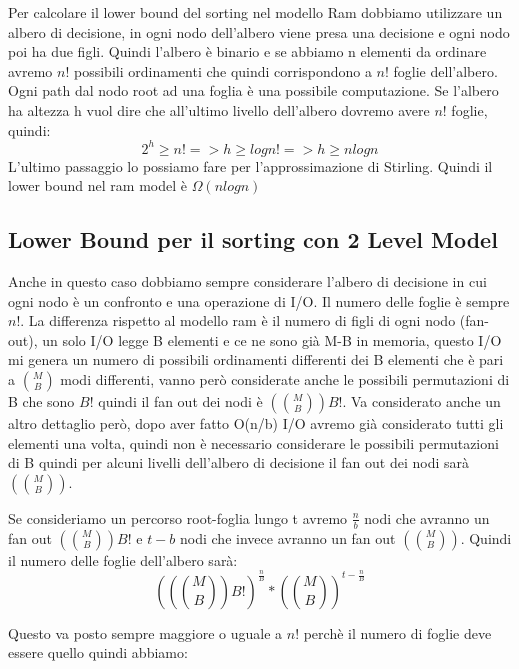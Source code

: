 \documentclass[14pt]{extreport}
\begin{document}
Per calcolare il lower bound del sorting nel modello Ram dobbiamo utilizzare un albero di decisione, in ogni nodo dell'albero viene presa una decisione e ogni nodo poi ha due figli. Quindi l'albero è binario e se abbiamo n elementi da ordinare avremo $n!$ possibili ordinamenti che quindi corrispondono a $n!$ foglie dell'albero.
Ogni path dal nodo root ad una foglia è una possibile computazione.
Se l'albero ha altezza h vuol dire che all'ultimo livello dell'albero dovremo avere $n!$ foglie, quindi:
\begin{equation}
    2^h \geq n! => h \geq log n! => h \geq n log n
\end{equation}
L'ultimo passaggio lo possiamo fare per l'approssimazione di Stirling. Quindi il lower bound nel ram model è $\Omega(nlogn)$

\subsection{Lower Bound per il sorting con 2 Level Model}

Anche in questo caso dobbiamo sempre considerare l'albero di decisione in cui ogni nodo è un confronto e una operazione di I/O. Il numero delle foglie è sempre $n!$. 
La differenza rispetto al modello ram è il numero di figli di ogni nodo (fan-out), un solo I/O legge B elementi e ce ne sono già M-B in memoria, questo I/O mi genera un numero di possibili ordinamenti differenti dei B elementi che è pari a $\binom{M}{B}$ modi differenti, vanno però considerate anche le possibili permutazioni di B che sono $B!$ quindi il fan out dei nodi è $(\binom{M}{B})B!$.
Va considerato anche un altro dettaglio però, dopo aver fatto O(n/b) I/O avremo già considerato tutti gli elementi una volta, quindi non è necessario considerare le possibili permutazioni di B quindi per alcuni livelli dell'albero di decisione il fan out dei nodi sarà $(\binom{M}{B})$.

Se consideriamo un percorso root-foglia lungo t avremo $\frac{n}{b}$ nodi che avranno un fan out $(\binom{M}{B})B!$ e $t-b$ nodi che invece avranno un fan out $(\binom{M}{B})$.
Quindi il numero delle foglie dell'albero sarà:
\begin{equation}
    ((\binom{M}{B})B!)^{\frac{n}{B}} * (\binom{M}{B})^{t-\frac{n}{B}} 
\end{equation}

Questo va posto sempre maggiore o uguale a $n!$ perchè il numero di foglie deve essere quello quindi abbiamo:
\end{document}
